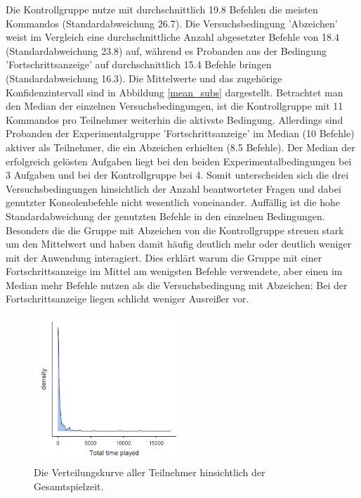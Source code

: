 Die Kontrollgruppe nutze mit durchschnittlich 19.8 Befehlen die meisten Kommandos (Standardabweichung 26.7). Die Versuchsbedingung 'Abzeichen' weist im Vergleich eine durchschnittliche Anzahl abgesetzter Befehle von 18.4 (Standardabweichung 23.8) auf, während es Probanden aus der Bedingung 'Fortschrittsanzeige' auf durchschnittlich 15.4 Befehle bringen (Standardabweichung 16.3). Die Mittelwerte und das zugehörige Konfidenzintervall sind in Abbildung \ref{mean_subs} dargestellt. Betrachtet man den Median der einzelnen Versuchsbedingungen, ist die Kontrollgruppe mit 11 Kommandos pro Teilnehmer weiterhin die aktivste Bedingung. Allerdings sind Probanden der Experimentalgruppe 'Fortschrittsanzeige' im Median (10 Befehle) aktiver als Teilnehmer, die ein Abzeichen erhielten (8.5 Befehle). Der Median der erfolgreich gelösten Aufgaben liegt bei den beiden Experimentalbedingungen bei 3 Aufgaben und bei der Kontrollgruppe bei 4. Somit unterscheiden sich die drei Versuchsbedingungen hinsichtlich der Anzahl beantworteter Fragen und dabei genutzter Konsolenbefehle nicht wesentlich voneinander. Auffällig ist die hohe Standardabweichung der genutzten Befehle in den einzelnen Bedingungen. Besonders die die Gruppe mit Abzeichen von die Kontrollgruppe streuen stark um den Mittelwert und haben damit häufig deutlich mehr oder deutlich weniger mit der Anwendung interagiert. Dies erklärt warum die Gruppe mit einer Fortschrittsanzeige im Mittel am wenigsten Befehle verwendete, aber einen im Median mehr Befehle nutzen als die Versuchsbedingung mit Abzeichen: Bei der Fortschrittsanzeige liegen schlicht weniger Ausreißer vor.  


\begin{figure}[htbp]
    \centering
    \includegraphics[width=0.5\textwidth]{img/auswertung/density.png}
    \caption{Die Verteilungskurve aller Teilnehmer hinsichtlich der Gesamtspielzeit.}
    \label{density}
\end{figure}


